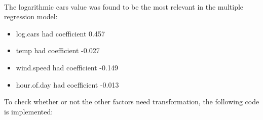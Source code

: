 \documentclass[6pt]{article}
\providecommand{\tightlist}{%
      \setlength{\itemsep}{0pt}\setlength{\parskip}{0pt}}
\begin{document}
    \begin{center}
    \end{center}
    { \hspace*{\fill} \\}
    
    The logarithmic cars value was found to be the most relevant in the
multiple regression model:

\begin{itemize}
\tightlist
\item
  log.cars had coefficient 0.457
\item
  temp had coefficient -0.027
\item
  wind.speed had coefficient -0.149
\item
  hour.of.day had coefficient -0.013
\end{itemize}

To check whether or not the other factors need transformation, the
following code is implemented:
\end{document}
